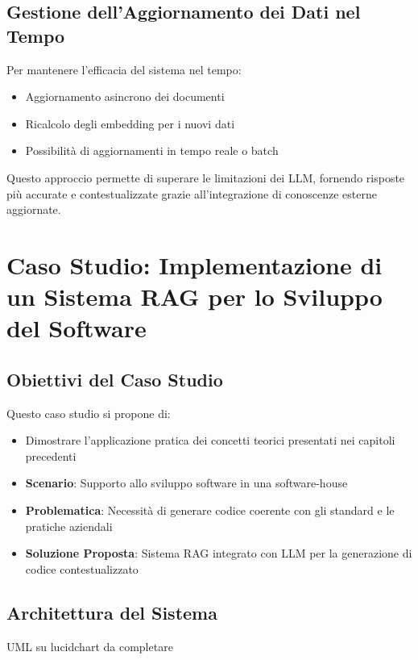 \documentclass[12pt,a4paper,openright,twoside]{book}
\begin{document}
\section{Gestione dell'Aggiornamento dei Dati nel Tempo}
Per mantenere l'efficacia del sistema nel tempo:
\begin{itemize}
    \item Aggiornamento asincrono dei documenti
    \item Ricalcolo degli embedding per i nuovi dati
    \item Possibilità di aggiornamenti in tempo reale o batch
\end{itemize}

Questo approccio permette di superare le limitazioni dei LLM, fornendo risposte più accurate e contestualizzate grazie all'integrazione di conoscenze esterne aggiornate.

\chapter{Caso Studio: Implementazione di un Sistema RAG per lo Sviluppo del Software}

\section{Obiettivi del Caso Studio}
Questo caso studio si propone di:
\begin{itemize}
    \item Dimostrare l'applicazione pratica dei concetti teorici presentati nei capitoli precedenti
    \item \textbf{Scenario}: Supporto allo sviluppo software in una software-house
    \item \textbf{Problematica}: Necessità di generare codice coerente con gli standard e le pratiche aziendali
    \item \textbf{Soluzione Proposta}: Sistema RAG integrato con LLM per la generazione di codice contestualizzato
\end{itemize}


\section{Architettura del Sistema}
UML su lucidchart da completare
\end{document}
